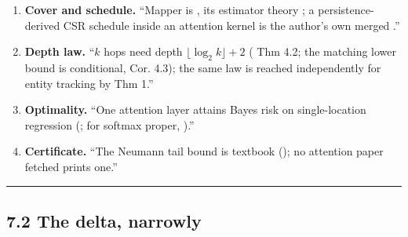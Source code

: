 \documentclass[11pt,a4paper]{article}
\theoremstyle{plain}
\theoremstyle{definition}
\theoremstyle{remark}
\begin{document}
\begin{enumerate}
  \textbf{Barcode.} ``Persistence of a thresholded attention graph is
  \citep{kushnareva-2021-tda-attention}; an intervention read through
  persistence summaries is \citep{kim-2026-topological-causal}.''
\item
  \textbf{Cover and schedule.} ``Mapper is \citep{singh-2007-mapper},
  its estimator theory \citep{carriere-2018-mapper-statistics}; a
  persistence-derived CSR schedule inside an attention kernel is the
  author's own merged \citep{sharma-2026-kernels-22}.''
\item
  \textbf{Depth law.} ``\(k\) hops need depth
  \(\lfloor\log_2 k\rfloor+2\) (\citep{sanford-2024-logdepth} Thm 4.2;
  the matching lower bound is conditional, Cor. 4.3); the same law is
  reached independently for entity tracking by
  \citep{fagnou-2024-chacal} Thm 1.''
\item
  \textbf{Optimality.} ``One attention layer attains Bayes risk on
  single-location regression (\citep{marion-2025-single-location}; for
  softmax proper, \citep{duranthon-2026-softmax-advantage}).''
\item
  \textbf{Certificate.} ``The Neumann tail bound is textbook
  (\citep{meyer-2000-matrix}); no attention paper fetched prints one.''
\end{enumerate}

\begin{center}\rule{0.5\linewidth}{0.5pt}\end{center}

\subsection{7.2 The delta, narrowly}\label{the-delta-narrowly}
\end{document}
